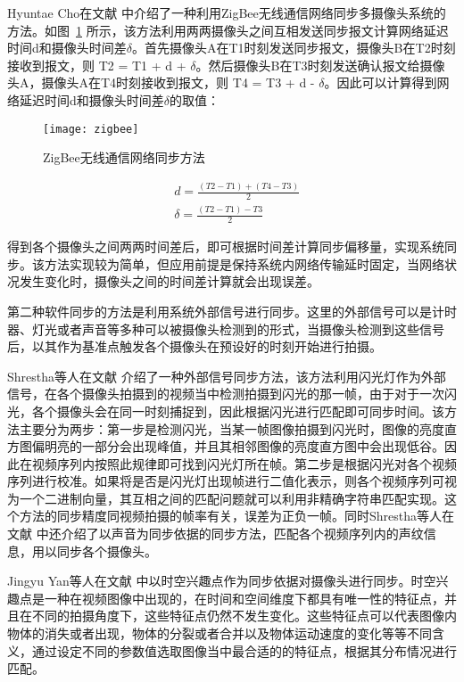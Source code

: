 Hyuntae Cho在文献 \cite{cho2016time} 中介绍了一种利用ZigBee无线通信网络同步多摄像头系统的方法。如图~\ref{zigbee} 所示，该方法利用两两摄像头之间互相发送同步报文计算网络延迟时间d和摄像头时间差$\delta$。首先摄像头A在T1时刻发送同步报文，摄像头B在T2时刻接收到报文，则 T2 = T1 + d + $\delta $。然后摄像头B在T3时刻发送确认报文给摄像头A，摄像头A在T4时刻接收到报文，则 T4 = T3 + d - $\delta $。因此可以计算得到网络延迟时间d和摄像头时间差$\delta$的取值：

\begin{figure}[h] 
  \centering
  \texttt{[image: zigbee]}
  \caption{ZigBee无线通信网络同步方法}
  \label{zigbee}
\end{figure}

\begin{equation}
\begin{split}
&d = \frac{(T2 - T1) + (T4 - T3)}{2} \\
&\delta = \frac{(T2 - T1) - T3}{2}
\end{split}
\end{equation}

得到各个摄像头之间两两时间差后，即可根据时间差计算同步偏移量，实现系统同步。该方法实现较为简单，但应用前提是保持系统内网络传输延时固定，当网络状况发生变化时，摄像头之间的时间差计算就会出现误差。

第二种软件同步的方法是利用系统外部信号进行同步。这里的外部信号可以是计时器、灯光或者声音等多种可以被摄像头检测到的形式，当摄像头检测到这些信号后，以其作为基准点触发各个摄像头在预设好的时刻开始进行拍摄。

Shrestha等人在文献 \cite{shrestha2006synchronization} 介绍了一种外部信号同步方法，该方法利用闪光灯作为外部信号，在各个摄像头拍摄到的视频当中检测拍摄到闪光的那一帧，由于对于一次闪光，各个摄像头会在同一时刻捕捉到，因此根据闪光进行匹配即可同步时间。该方法主要分为两步：第一步是检测闪光，当某一帧图像拍摄到闪光时，图像的亮度直方图偏明亮的一部分会出现峰值，并且其相邻图像的亮度直方图中会出现低谷。因此在视频序列内按照此规律即可找到闪光灯所在帧。第二步是根据闪光对各个视频序列进行校准。如果将是否是闪光灯出现帧进行二值化表示，则各个视频序列可视为一个二进制向量，其互相之间的匹配问题就可以利用非精确字符串匹配实现。这个方法的同步精度同视频拍摄的帧率有关，误差为正负一帧。同时Shrestha等人在文献 \cite{shrstha2007synchronization} 中还介绍了以声音为同步依据的同步方法，匹配各个视频序列内的声纹信息，用以同步各个摄像头。

Jingyu Yan等人在文献 \cite{yan2004video} 中以时空兴趣点作为同步依据对摄像头进行同步。时空兴趣点是一种在视频图像中出现的，在时间和空间维度下都具有唯一性的特征点，并且在不同的拍摄角度下，这些特征点仍然不发生变化。这些特征点可以代表图像内物体的消失或者出现，物体的分裂或者合并以及物体运动速度的变化等等不同含义，通过设定不同的参数值选取图像当中最合适的的特征点，根据其分布情况进行匹配。


